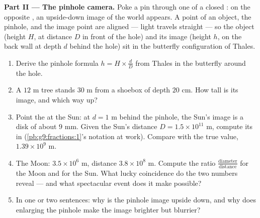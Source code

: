 \begin{problem}
\medskip
\noindent\textbf{Part II --- The pinhole camera.}
Poke a pin through one  of a closed : on the opposite
, an upside-down image of the world appears. A point of an
object, the pinhole, and the image point are aligned --- light
travels straight --- so the object (height $H$, at distance $D$
in front of the hole) and its image (height $h$, on the back
wall at depth $d$ behind the hole) sit in the butterfly
configuration of Thales.
\begin{enumerate}[resume]
  \item Derive the pinhole formula
        $h = H \times \frac dD$ from Thales in the butterfly
        around the hole.
  \item A $12$ m tree stands $30$ m from a shoebox of depth
        $20$ cm. How tall is its image, and which way up?
  \item Point the  at the Sun: at $d = 1$ m behind the
        pinhole, the Sun's image is a disk of  about
        $9$ mm. Given the Sun's distance
        $D = 1.5 \times 10^{11}$ m, compute its  in
         (\cref{pb:g9:fractions:1}'s
        notation at work). Compare with the true value,
        $1.39 \times 10^9$ m.
  \item The Moon:  $3.5 \times 10^6$ m, distance
        $3.8 \times 10^8$ m. Compute the ratio
        $\frac{\text{diameter}}{\text{distance}}$ for the Moon
        and for the Sun. What lucky coincidence do the two
        numbers reveal --- and what spectacular event does it
        make possible?
  \item In one or two sentences: why is the pinhole image
        upside down, and why does enlarging the pinhole make the
        image brighter but blurrier?
\end{enumerate}


\end{problem}
